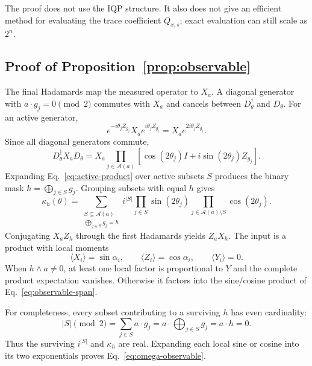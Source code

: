 The proof does not use the IQP structure.  It also does not give an efficient
method for evaluating the trace coefficient $Q_{x,s}$; exact evaluation can
still scale as $2^n$.

\subsection{Proof of Proposition~\ref{prop:observable}}

The final Hadamards map the measured operator to $X_a$.  A diagonal generator
with $a\cdot g_j=0\pmod2$ commutes with $X_a$ and cancels between
$D_\theta^\dagger$ and $D_\theta$.  For an active generator,
\begin{equation}
 e^{-i\theta_jZ_{g_j}}X_ae^{i\theta_jZ_{g_j}}
 =X_ae^{2i\theta_jZ_{g_j}}.
\end{equation}
Since all diagonal generators commute,
\begin{equation}
 D_\theta^\dagger X_aD_\theta
 =X_a\prod_{j\in\mathcal A(a)}
 \left[\cos(2\theta_j)I+i\sin(2\theta_j)Z_{g_j}\right].
 \label{eq:active-product}
\end{equation}
Expanding Eq.~\eqref{eq:active-product} over active subsets $S$ produces the
binary mask $h=\bigoplus_{j\in S}g_j$.  Grouping subsets with equal $h$ gives
\begin{equation}
 \kappa_h(\theta)=
 \sum_{\substack{S\subseteq\mathcal A(a)\\
                  \bigoplus_{j\in S}g_j=h}}
 i^{|S|}
 \prod_{j\in S}\sin(2\theta_j)
 \prod_{j\in\mathcal A(a)\setminus S}\cos(2\theta_j).
 \label{eq:kappa}
\end{equation}
Conjugating $X_aZ_h$ through the first Hadamards yields $Z_aX_h$.  The input
is a product with local moments
\begin{equation}
 \langle X_i\rangle=\sin\alpha_i,\qquad
 \langle Z_i\rangle=\cos\alpha_i,\qquad
 \langle Y_i\rangle=0.
\end{equation}
When $h\wedge a\ne0$, at least one local factor is proportional to $Y$ and
the complete product expectation vanishes.  Otherwise it factors into the
sine/cosine product of Eq.~\eqref{eq:observable-span}.

For completeness, every subset contributing to a surviving $h$ has even
cardinality:
\begin{equation}
 |S|\pmod2=\sum_{j\in S}a\cdot g_j
 =a\cdot\bigoplus_{j\in S}g_j=a\cdot h=0.
\end{equation}
Thus the surviving $i^{|S|}$ and $\kappa_h$ are real.  Expanding each local
sine or cosine into its two exponentials proves
Eq.~\eqref{eq:omega-observable}.

